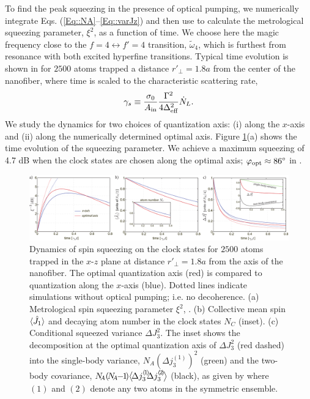 \documentclass[aps,pra,twocolumn]{revtex4-1} %
\newcommand{\varz}{\Delta J_3^2}
\newcommand{\qangle}{\varphi}
\newcommand{\magic}[1]{\tilde{\omega}_{#1}}
\begin{document}
To find the peak squeezing in the presence of optical pumping, we numerically integrate Eqs. (\ref{Eq::NA}--\ref{Eq::varJz}) and then use  to calculate the metrological squeezing parameter, $\xi^2$, as a function of time. 
We choose here the magic frequency close to the $ f=4\leftrightarrow f'=4 $ transition, $ \magic{4} $, which is furthest from resonance with both excited hyperfine transitions. 
Typical time evolution is shown in  for $2500$ atoms trapped a distance $r'\!_\perp=1.8a$ from the center of the nanofiber, {\color{blue} where time is scaled} to the characteristic scattering rate, 
\begin{align}\label{Eq::gamma_s}
\gamma_s \equiv \frac{\sigma_0}{A_{\rm in}}\frac{\Gamma^2}{4 \Delta_{\text{eff}}^2} \dot{N}_L .
\end{align}  
We study the dynamics for two choices of quantization axis: (i) along the $x$-axis and (ii) along the numerically determined optimal axis.  Figure \ref{Fig::Squeezing_Dynamics}(a) shows the time evolution of the squeezing parameter.  {\color{blue} We achieve a maximum squeezing of} 4.7 dB when the clock states are chosen along the optimal axis; $\qangle_{\rm opt} \approx 86^\circ$ in . 

\begin{figure}[t]
\includegraphics[scale=0.42]{./Figs/Fig_SqueezingDynamics}
\caption{Dynamics of spin squeezing on the clock states for $2500$ atoms trapped {\color{blue} in the $x$-$z$ plane at distance $ r'\!_\perp=1.8a$ from the axis of the nanofiber.} 
The optimal quantization axis (red) is compared to quantization along the $x$-axis (blue). 
Dotted lines indicate simulations without optical pumping; i.e. no decoherence. 
(a) Metrological spin squeezing parameter $\xi^{2}$, . 
(b) Collective mean spin $\langle{\hat{J}_1}\rangle$ and decaying atom number in the clock states $N\!_C$ (inset).
(c) Conditional squeezed variance $\varz$. 
The inset shows the decomposition at the optimal quantization axis of $ \Delta J_3^2 $ (red dashed) into the single-body variance, $N\!\!_A (\!\Delta j_3^{(\!1\!)})^2$ (green) and the two-body covariance, $N\!\!_A(\!N\!\!_A\!\!-\!\!1\!)\expect{\!\Delta j_3^{(\!1\!)}\!\!\Delta j_3^{(\!2\!)}\!}$ (black), as given by  {\color{blue} where $(1)$ and $(2)$ denote any two atoms in the symmetric ensemble}.
}\label{Fig::Squeezing_Dynamics}
\end{figure}
\end{document}
